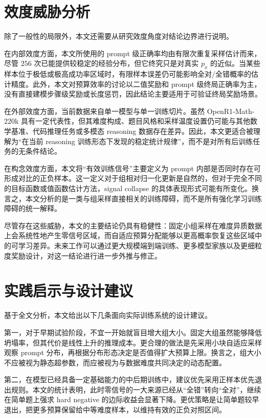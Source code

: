 \section{效度威胁分析}

除了一般性的局限外，本文还需要从研究效度角度对结论边界进行说明。

在内部效度方面，本文所使用的 prompt 级正确率均由有限次重复采样估计而来，尽管 $256$ 次已能提供较稳定的经验分布，但它终究只是对真实 $p_x$ 的近似。当某些样本位于极低或极高成功率区域时，有限样本误差仍可能影响全对/全错概率的估计精度。此外，本文对预算效率的讨论以二值奖励和 prompt 级终局正确率为主，没有直接建模步骤级奖励或长度惩罚，因此结论主要适用于可验证终局奖励场景。

在外部效度方面，当前数据来自单一模型与单一训练切片。虽然 OpenR1-Math-220k 具有一定代表性，但其难度构成、题目风格和采样温度设置仍可能与其他数学基准、代码推理任务或多模态 reasoning 数据存在差异。因此，本文更适合被理解为“在当前 reasoning 训练形态下发现的稳定统计规律”，而不是对所有后训练任务的无条件结论。

在构念效度方面，本文将“有效训练信号”主要定义为 prompt 内部是否同时存在可形成对比的正负样本。这一定义对于组相对归一化更新是自然的，但对于完全不同的目标函数或值函数估计方法，signal collapse 的具体表现形式可能有所变化。换言之，本文分析的是一类与组采样直接相关的训练障碍，而不是所有强化学习训练障碍的统一解释。

尽管存在这些威胁，本文的主要结论仍具有稳健性：固定小组采样在难度异质数据上会系统性地产生零信号区域，而自适应预算分配能够以更高概率恢复这些区域中的可学习差异。未来工作可以通过更大规模端到端训练、更多模型家族以及更细粒度奖励设计，对这一结论进行进一步外推与修正。

\section{实践启示与设计建议}

基于全文分析，本文给出以下几条面向实际训练系统的设计建议。

第一，对于早期试验阶段，不宜一开始就盲目增大组大小。固定大组虽然能够降低坍塌率，但其代价是线性上升的推理成本。更合理的做法是先采用小块自适应采样观察 prompt 分布，再根据分布形态决定是否值得扩大预算上限。换言之，组大小不应被视为静态超参数，而应被视为与数据难度共同决定的动态配置。

第二，在模型已经具备一定基础能力的中后期训练中，建议优先采用正样本优先退出规则。本文的统计表明，此时零信号的一大来源已经从“全错”转向“全对”，继续在简单题上强求 hard negative 的边际收益会显著下降。更优策略是让简单题较早退出，把更多预算保留给中等难度样本，以维持有效的正负对照区间。

